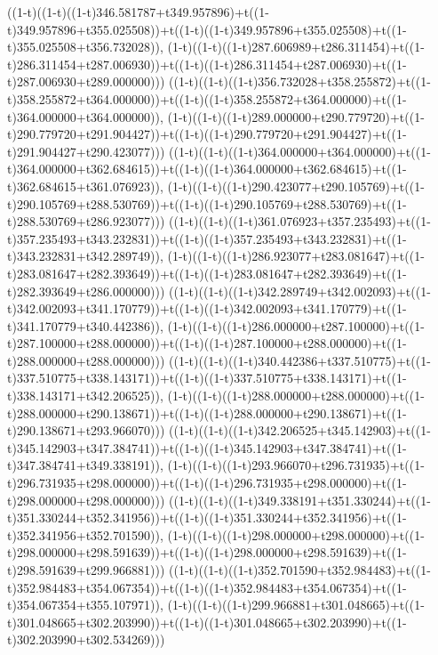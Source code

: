 ((1-t)((1-t)((1-t)346.581787+t349.957896)+t((1-t)349.957896+t355.025508))+t((1-t)((1-t)349.957896+t355.025508)+t((1-t)355.025508+t356.732028)),                                     (1-t)((1-t)((1-t)287.606989+t286.311454)+t((1-t)286.311454+t287.006930))+t((1-t)((1-t)286.311454+t287.006930)+t((1-t)287.006930+t289.000000)))
((1-t)((1-t)((1-t)356.732028+t358.255872)+t((1-t)358.255872+t364.000000))+t((1-t)((1-t)358.255872+t364.000000)+t((1-t)364.000000+t364.000000)),                                     (1-t)((1-t)((1-t)289.000000+t290.779720)+t((1-t)290.779720+t291.904427))+t((1-t)((1-t)290.779720+t291.904427)+t((1-t)291.904427+t290.423077)))
((1-t)((1-t)((1-t)364.000000+t364.000000)+t((1-t)364.000000+t362.684615))+t((1-t)((1-t)364.000000+t362.684615)+t((1-t)362.684615+t361.076923)),                                     (1-t)((1-t)((1-t)290.423077+t290.105769)+t((1-t)290.105769+t288.530769))+t((1-t)((1-t)290.105769+t288.530769)+t((1-t)288.530769+t286.923077)))
((1-t)((1-t)((1-t)361.076923+t357.235493)+t((1-t)357.235493+t343.232831))+t((1-t)((1-t)357.235493+t343.232831)+t((1-t)343.232831+t342.289749)),                                     (1-t)((1-t)((1-t)286.923077+t283.081647)+t((1-t)283.081647+t282.393649))+t((1-t)((1-t)283.081647+t282.393649)+t((1-t)282.393649+t286.000000)))
((1-t)((1-t)((1-t)342.289749+t342.002093)+t((1-t)342.002093+t341.170779))+t((1-t)((1-t)342.002093+t341.170779)+t((1-t)341.170779+t340.442386)),                                     (1-t)((1-t)((1-t)286.000000+t287.100000)+t((1-t)287.100000+t288.000000))+t((1-t)((1-t)287.100000+t288.000000)+t((1-t)288.000000+t288.000000)))
((1-t)((1-t)((1-t)340.442386+t337.510775)+t((1-t)337.510775+t338.143171))+t((1-t)((1-t)337.510775+t338.143171)+t((1-t)338.143171+t342.206525)),                                     (1-t)((1-t)((1-t)288.000000+t288.000000)+t((1-t)288.000000+t290.138671))+t((1-t)((1-t)288.000000+t290.138671)+t((1-t)290.138671+t293.966070)))
((1-t)((1-t)((1-t)342.206525+t345.142903)+t((1-t)345.142903+t347.384741))+t((1-t)((1-t)345.142903+t347.384741)+t((1-t)347.384741+t349.338191)),                                     (1-t)((1-t)((1-t)293.966070+t296.731935)+t((1-t)296.731935+t298.000000))+t((1-t)((1-t)296.731935+t298.000000)+t((1-t)298.000000+t298.000000)))
((1-t)((1-t)((1-t)349.338191+t351.330244)+t((1-t)351.330244+t352.341956))+t((1-t)((1-t)351.330244+t352.341956)+t((1-t)352.341956+t352.701590)),                                     (1-t)((1-t)((1-t)298.000000+t298.000000)+t((1-t)298.000000+t298.591639))+t((1-t)((1-t)298.000000+t298.591639)+t((1-t)298.591639+t299.966881)))
((1-t)((1-t)((1-t)352.701590+t352.984483)+t((1-t)352.984483+t354.067354))+t((1-t)((1-t)352.984483+t354.067354)+t((1-t)354.067354+t355.107971)),                                     (1-t)((1-t)((1-t)299.966881+t301.048665)+t((1-t)301.048665+t302.203990))+t((1-t)((1-t)301.048665+t302.203990)+t((1-t)302.203990+t302.534269)))
